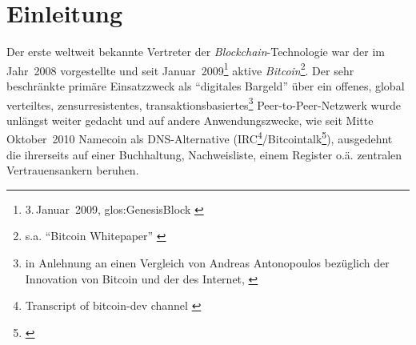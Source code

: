 






\chapter{Einleitung}\label{einleitung}


Der erste weltweit bekannte Vertreter der \emph{Blockchain}-Technologie war der im Jahr~2008 vorgestellte und seit Januar~2009\footnote{3.\,Januar~2009, \gls{glos:GenesisBlock} \autocite{w:bitcoin-wiki}} aktive \emph{Bitcoin}\footnote{s.a. \enquote{Bitcoin Whitepaper} \autocite{p:bitcoin}}.
Der sehr beschränkte primäre Einsatzzweck als \enquote{digitales Bargeld} über ein offenes, global verteiltes, zensurresistentes, transaktionsbasiertes\footnote{in Anlehnung an einen Vergleich von Andreas Antonopoulos bezüglich der Innovation von Bitcoin und der des Internet, \autocite{o:open-blockchain}} Peer-to-Peer-Netzwerk  wurde unlängst weiter gedacht und auf andere Anwendungszwecke, wie \zB{} seit Mitte Oktober~2010 Namecoin als DNS-Alternative (IRC\footnote{Transcript of bitcoin-dev channel \autocite{w:irc-ts-bitcoindev}}/Bitcointalk\footnote{\cite{w:bitcointalk-bitdns}}), ausgedehnt die ihrerseits auf einer Buchhaltung, Nachweisliste, einem Register o.ä. zentralen Vertrauensankern beruhen.

